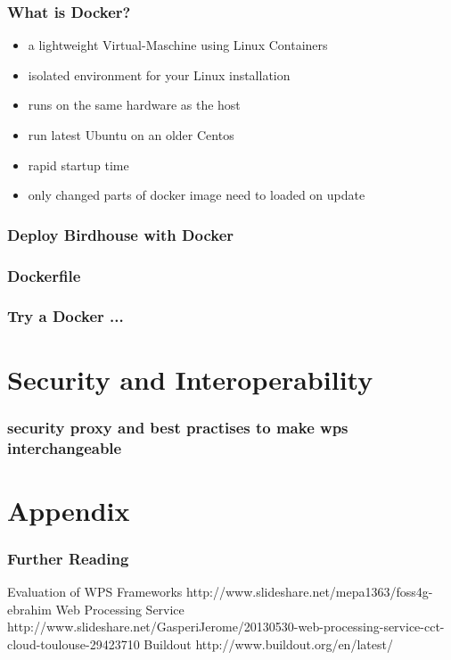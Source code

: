 \documentclass{beamer}
\begin{document}
  \begin{frame}
    \frametitle{What is Docker?}
    \begin{itemize}
      \item a lightweight Virtual-Maschine using Linux Containers
      \item isolated environment for your Linux installation
      \item runs on the same hardware as the host
      \item run latest Ubuntu on an older Centos
      \item rapid startup time
      \item only changed parts of docker image need to loaded on update
    \end{itemize}
  \end{frame}

  \begin{frame}[plain]
    \frametitle{Deploy Birdhouse with Docker}
    \begin{figure}
    \end{figure}
  \end{frame}

  \begin{frame}[shrink]
    \frametitle{Dockerfile}
\end{frame}

  \begin{frame}[shrink]
    \frametitle{Try a Docker ...}
\end{frame}

  \section{Security and Interoperability}

  \begin{frame}
    \frametitle{security proxy and best practises to make wps interchangeable}
  \end{frame}

  \appendix

  \section{Appendix}
  
   \begin{frame}[allowframebreaks]
    \frametitle<presentation>{Further Reading}    
    \begin{thebibliography}{10}    
      \beamertemplatearticlebibitems
      Evaluation of WPS Frameworks
      \newblock http://www.slideshare.net/mepa1363/foss4g-ebrahim
      Web Processing Service
      \newblock http://www.slideshare.net/GasperiJerome/20130530-web-processing-service-cct-cloud-toulouse-29423710
      Buildout
      \newblock http://www.buildout.org/en/latest/
    \end{thebibliography}
    
  \end{frame}
  
\end{document}
